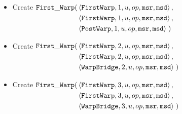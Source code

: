 \begin{itemize}
\begin{itemize}
                \item Create
                $\begin{aligned}[t]
                    \firstwarp(& \left\langle {\tt FirstWarp}, 1, u, \inc, {\tt msr}, {\tt msd} \right\rangle, \\ %
                               & \left\langle {\tt FirstWarp}, 1, u, \inc, {\tt msr}, {\tt msd} \right\rangle, \\ %
                               & \left\langle {\tt PostWarp},  1, u, \inc, {\tt msr}, {\tt msd} \right\rangle \;) %
                \end{aligned}$
                \vspace{.5cm}

                \item Create
                $\begin{aligned}[t]
                    \firstwarp(& \left\langle {\tt FirstWarp},  2, u, \inc, {\tt msr}, {\tt msd} \right\rangle, \\ %
                               & \left\langle {\tt FirstWarp},  2, u, \inc, {\tt msr}, {\tt msd} \right\rangle, \\ %
                               & \left\langle {\tt WarpBridge}, 2, u, \inc, {\tt msr}, {\tt msd} \right\rangle \;) %
                \end{aligned}$
                \vspace{.5cm}

                \item Create
                $\begin{aligned}[t]
                    \firstwarp(& \left\langle {\tt FirstWarp},  3, u, \inc, {\tt msr}, {\tt msd} \right\rangle,\\  %
                               & \left\langle {\tt FirstWarp},  3, u, \inc, {\tt msr}, {\tt msd} \right\rangle,\\  %
                               & \left\langle {\tt WarpBridge}, 3, u, \inc, {\tt msr}, {\tt msd} \right\rangle \;) %
                \end{aligned}$
                \vspace{.5cm}

            \end{itemize}
            \vspace{.5cm}


\end{itemize}

